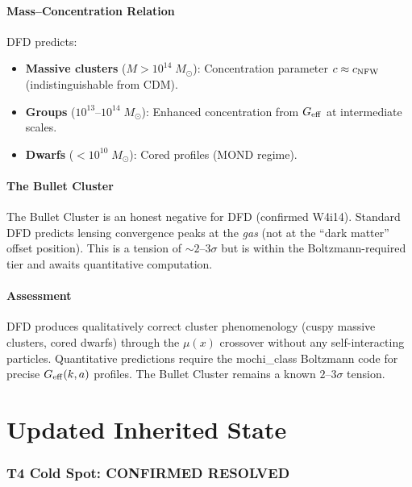 \documentclass[11pt,a4paper]{article}
\newcounter{findingctr}
\newenvironment{finding}[1][]{%
  \refstepcounter{findingctr}%
  \begin{tcolorbox}[colback=blue!3!white, colframe=blue!50!black,
    title=\textbf{Finding \thefindingctr: #1}]
}{%
  \end{tcolorbox}%
}
\newcommand{\Geff}{G_{\rm eff}}
\begin{document}
\begin{finding}[\textbf{Cluster Cores}: NFW-Like from $\psi$-Field
  Nonlinearity, No DM Self-Interaction]
\subsection*{Mass--Concentration Relation}

DFD predicts:
\begin{itemize}[nosep]
\item \textbf{Massive clusters} ($M > 10^{14}\;M_\odot$):
  Concentration parameter $c \approx c_{\rm NFW}$
  (indistinguishable from CDM).
\item \textbf{Groups} ($10^{13}$--$10^{14}\;M_\odot$):
  Enhanced concentration from $\Geff$ at intermediate scales.
\item \textbf{Dwarfs} ($< 10^{10}\;M_\odot$):
  Cored profiles (MOND regime).
\end{itemize}

\subsection*{The Bullet Cluster}

The Bullet Cluster is an honest negative for DFD (confirmed W4i14).
Standard DFD predicts lensing convergence peaks at the \emph{gas}
(not at the ``dark matter'' offset position).  This is a tension
of $\sim 2$--$3\sigma$ but is within the Boltzmann-required tier
and awaits quantitative computation.

\subsection*{Assessment}

DFD produces qualitatively correct cluster phenomenology
(cuspy massive clusters, cored dwarfs) through the $\mu(x)$
crossover without any self-interacting particles.  Quantitative
predictions require the mochi\_class Boltzmann code for precise
$\Geff(k,a)$ profiles.  The Bullet Cluster remains a known
$2$--$3\sigma$ tension.

\end{finding}


\part{Updated Inherited State}
\label{sec:updates}

\section{T4 Cold Spot: CONFIRMED RESOLVED}
\end{document}
